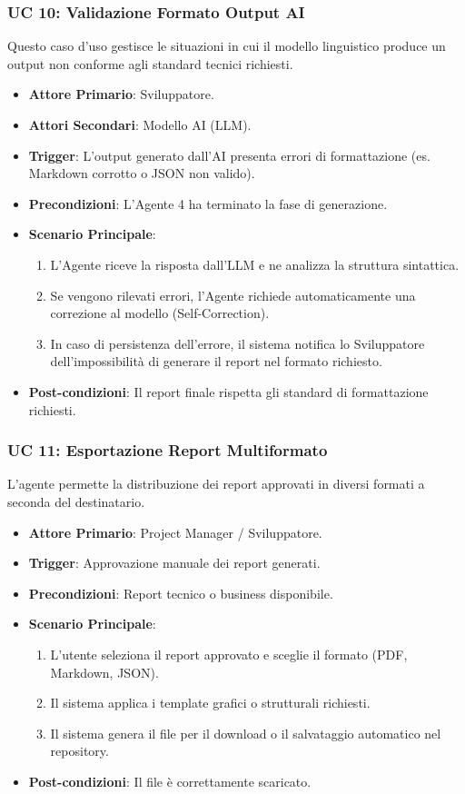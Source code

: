 \documentclass[12pt, a4paper]{article}
\begin{document}
\subsubsection{UC 10: Validazione Formato Output AI}
Questo caso d'uso gestisce le situazioni in cui il modello linguistico produce un output non conforme agli standard tecnici richiesti.
\begin{itemize}
\item \textbf{Attore Primario}: Sviluppatore.
\item \textbf{Attori Secondari}: Modello AI (LLM).
\item \textbf{Trigger}: L'output generato dall'AI presenta errori di formattazione (es. Markdown corrotto o JSON non valido).
\item \textbf{Precondizioni}: L'Agente 4 ha terminato la fase di generazione.
\item \textbf{Scenario Principale}:
\begin{enumerate}
\item L'Agente riceve la risposta dall'LLM e ne analizza la struttura sintattica.
\item Se vengono rilevati errori, l'Agente richiede automaticamente una correzione al modello (Self-Correction).
\item In caso di persistenza dell'errore, il sistema notifica lo Sviluppatore dell'impossibilità di generare il report nel formato richiesto.
\end{enumerate}
\item \textbf{Post-condizioni}: Il report finale rispetta gli standard di formattazione richiesti.
\end{itemize}

\subsubsection{UC 11: Esportazione Report Multiformato}
L'agente permette la distribuzione dei report approvati in diversi formati a seconda del destinatario.
\begin{itemize}
\item \textbf{Attore Primario}: Project Manager / Sviluppatore.
\item \textbf{Trigger}: Approvazione manuale dei report generati.
\item \textbf{Precondizioni}: Report tecnico o business disponibile.
\item \textbf{Scenario Principale}:
\begin{enumerate}
\item L'utente seleziona il report approvato e sceglie il formato (PDF, Markdown, JSON).
\item Il sistema applica i template grafici o strutturali richiesti.
\item Il sistema genera il file per il download o il salvataggio automatico nel repository.
\end{enumerate}
\item \textbf{Post-condizioni}: Il file è correttamente scaricato.
\end{itemize}
\end{document}
